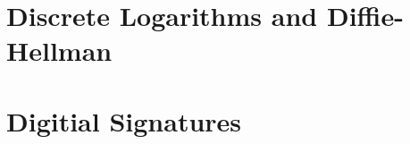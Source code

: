 \documentclass[12pt, oneside]{book}
\begin{document}














% 

\setcounter{chapter}{1}

\chapter{Discrete Logarithms and Diffie-Hellman}\label{discrete log}
\vspace*{-0.25in}


% 

\setcounter{chapter}{3}


\chapter{Digitial Signatures}\label{dig sig}
\vspace*{-0.25in}


\setcounter{chapter}{5}
\end{document}
